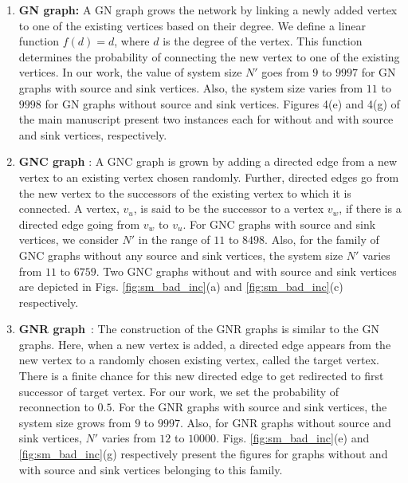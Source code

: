 \documentclass[%
 reprint,
 superscriptaddress,
 amsmath,amssymb,
 aps,
 pra,
floatfix,
nofootinbib,
]{revtex4-2}
\theoremstyle{definition}
\theoremstyle{remark}
\begin{document}
\begin{appendix}
\begin{enumerate}

    \item 
    \textbf{GN graph:} A GN graph grows the network by linking a newly added vertex to one of the existing vertices based on their degree. We define a linear function $f(d)=d$, where $d$ is the degree of the vertex. This function determines the probability of connecting the new vertex to one of the existing vertices. In our work, the value of system size $N'$ goes from $9$ to $9997$ for GN graphs with source and sink vertices. Also, the system size varies from $11$ to $9998$ for GN graphs without source and sink vertices. Figures 4(e) and 4(g) of the main manuscript present two instances each for without and with source and sink vertices, respectively.
    
    \item 
    \textbf{GNC graph} 
    \cite{krapivsky2005network}: A GNC graph is grown by adding a directed edge from a new vertex to an existing vertex chosen randomly. Further, directed edges go from the new vertex to the successors of the existing vertex to which it is connected. A vertex, $v_u$, is said to be the successor to a vertex $v_w$, if there is a directed edge going from $v_w$ to $v_u$. For GNC graphs with source and sink vertices, we consider $N'$ in the range of $11$ to $8498$. Also, for the family of GNC graphs without any source and sink vertices, the system size $N'$ varies from $11$ to $6759$. Two GNC graphs without and with source and sink vertices are depicted in Figs. \ref{fig:sm_bad_inc}(a) and \ref{fig:sm_bad_inc}(c) respectively.
    
    \item 
    \textbf{GNR graph}~\cite{krapivsky2001organization}: 
    The construction of the GNR graphs is similar to the GN graphs. Here, when a new vertex is added, a directed edge appears from the new vertex to a randomly chosen existing vertex, called the target vertex. There is a finite chance for this new directed edge to get redirected to first successor of target vertex. For our work, we set the probability of reconnection to $0.5$. For the GNR graphs with source and sink vertices, the system size grows from $9$ to $9997$. Also, for GNR graphs without source and sink vertices, $N'$ varies from $12$ to $10000$. Figs. \ref{fig:sm_bad_inc}(e) and \ref{fig:sm_bad_inc}(g) respectively present the figures for graphs without and with source and sink vertices belonging to this family.
    

\end{enumerate}
\end{appendix}
\end{document}
